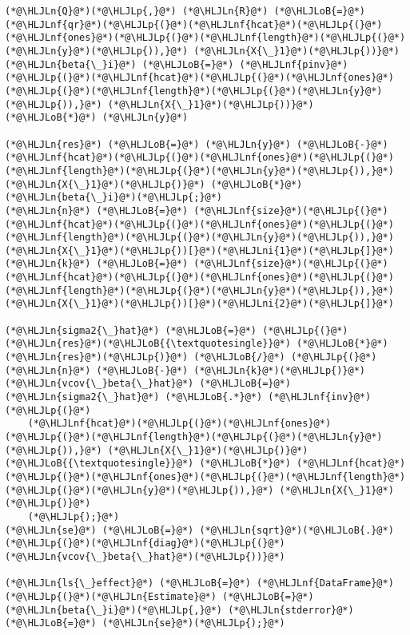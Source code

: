 \documentclass[12pt,a4paper]{article}
\newcommand{\HLJLn}[1]{#1}
\newcommand{\HLJLnf}[1]{\textcolor[RGB]{66,102,213}{#1}}
\newcommand{\HLJLni}[1]{\textcolor[RGB]{59,151,46}{#1}}
\newcommand{\HLJLoB}[1]{\textcolor[RGB]{102,102,102}{\textbf{#1}}}
\newcommand{\HLJLp}[1]{#1}
\begin{document}
\begin{lstlisting}
(*@\HLJLn{Q}@*)(*@\HLJLp{,}@*) (*@\HLJLn{R}@*) (*@\HLJLoB{=}@*) (*@\HLJLnf{qr}@*)(*@\HLJLp{(}@*)(*@\HLJLnf{hcat}@*)(*@\HLJLp{(}@*)(*@\HLJLnf{ones}@*)(*@\HLJLp{(}@*)(*@\HLJLnf{length}@*)(*@\HLJLp{(}@*)(*@\HLJLn{y}@*)(*@\HLJLp{)),}@*) (*@\HLJLn{X{\_}1}@*)(*@\HLJLp{))}@*)
(*@\HLJLn{beta{\_}i}@*) (*@\HLJLoB{=}@*) (*@\HLJLnf{pinv}@*)(*@\HLJLp{(}@*)(*@\HLJLnf{hcat}@*)(*@\HLJLp{(}@*)(*@\HLJLnf{ones}@*)(*@\HLJLp{(}@*)(*@\HLJLnf{length}@*)(*@\HLJLp{(}@*)(*@\HLJLn{y}@*)(*@\HLJLp{)),}@*) (*@\HLJLn{X{\_}1}@*)(*@\HLJLp{))}@*) (*@\HLJLoB{*}@*) (*@\HLJLn{y}@*)

(*@\HLJLn{res}@*) (*@\HLJLoB{=}@*) (*@\HLJLn{y}@*) (*@\HLJLoB{-}@*) (*@\HLJLnf{hcat}@*)(*@\HLJLp{(}@*)(*@\HLJLnf{ones}@*)(*@\HLJLp{(}@*)(*@\HLJLnf{length}@*)(*@\HLJLp{(}@*)(*@\HLJLn{y}@*)(*@\HLJLp{)),}@*) (*@\HLJLn{X{\_}1}@*)(*@\HLJLp{)}@*) (*@\HLJLoB{*}@*) (*@\HLJLn{beta{\_}i}@*)(*@\HLJLp{;}@*)
(*@\HLJLn{n}@*) (*@\HLJLoB{=}@*) (*@\HLJLnf{size}@*)(*@\HLJLp{(}@*)(*@\HLJLnf{hcat}@*)(*@\HLJLp{(}@*)(*@\HLJLnf{ones}@*)(*@\HLJLp{(}@*)(*@\HLJLnf{length}@*)(*@\HLJLp{(}@*)(*@\HLJLn{y}@*)(*@\HLJLp{)),}@*) (*@\HLJLn{X{\_}1}@*)(*@\HLJLp{))[}@*)(*@\HLJLni{1}@*)(*@\HLJLp{]}@*)
(*@\HLJLn{k}@*) (*@\HLJLoB{=}@*) (*@\HLJLnf{size}@*)(*@\HLJLp{(}@*)(*@\HLJLnf{hcat}@*)(*@\HLJLp{(}@*)(*@\HLJLnf{ones}@*)(*@\HLJLp{(}@*)(*@\HLJLnf{length}@*)(*@\HLJLp{(}@*)(*@\HLJLn{y}@*)(*@\HLJLp{)),}@*) (*@\HLJLn{X{\_}1}@*)(*@\HLJLp{))[}@*)(*@\HLJLni{2}@*)(*@\HLJLp{]}@*)

(*@\HLJLn{sigma2{\_}hat}@*) (*@\HLJLoB{=}@*) (*@\HLJLp{(}@*)(*@\HLJLn{res}@*)(*@\HLJLoB{{\textquotesingle}}@*) (*@\HLJLoB{*}@*) (*@\HLJLn{res}@*)(*@\HLJLp{)}@*) (*@\HLJLoB{/}@*) (*@\HLJLp{(}@*)(*@\HLJLn{n}@*) (*@\HLJLoB{-}@*) (*@\HLJLn{k}@*)(*@\HLJLp{)}@*)
(*@\HLJLn{vcov{\_}beta{\_}hat}@*) (*@\HLJLoB{=}@*) (*@\HLJLn{sigma2{\_}hat}@*) (*@\HLJLoB{.*}@*) (*@\HLJLnf{inv}@*)(*@\HLJLp{(}@*)
    (*@\HLJLnf{hcat}@*)(*@\HLJLp{(}@*)(*@\HLJLnf{ones}@*)(*@\HLJLp{(}@*)(*@\HLJLnf{length}@*)(*@\HLJLp{(}@*)(*@\HLJLn{y}@*)(*@\HLJLp{)),}@*) (*@\HLJLn{X{\_}1}@*)(*@\HLJLp{)}@*)(*@\HLJLoB{{\textquotesingle}}@*) (*@\HLJLoB{*}@*) (*@\HLJLnf{hcat}@*)(*@\HLJLp{(}@*)(*@\HLJLnf{ones}@*)(*@\HLJLp{(}@*)(*@\HLJLnf{length}@*)(*@\HLJLp{(}@*)(*@\HLJLn{y}@*)(*@\HLJLp{)),}@*) (*@\HLJLn{X{\_}1}@*)(*@\HLJLp{)}@*)
    (*@\HLJLp{);}@*)
(*@\HLJLn{se}@*) (*@\HLJLoB{=}@*) (*@\HLJLn{sqrt}@*)(*@\HLJLoB{.}@*)(*@\HLJLp{(}@*)(*@\HLJLnf{diag}@*)(*@\HLJLp{(}@*)(*@\HLJLn{vcov{\_}beta{\_}hat}@*)(*@\HLJLp{))}@*)

(*@\HLJLn{ls{\_}effect}@*) (*@\HLJLoB{=}@*) (*@\HLJLnf{DataFrame}@*)(*@\HLJLp{(}@*)(*@\HLJLn{Estimate}@*) (*@\HLJLoB{=}@*) (*@\HLJLn{beta{\_}i}@*)(*@\HLJLp{,}@*) (*@\HLJLn{stderror}@*) (*@\HLJLoB{=}@*) (*@\HLJLn{se}@*)(*@\HLJLp{);}@*)
\end{lstlisting}
\end{document}
